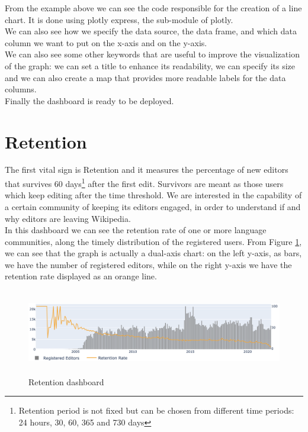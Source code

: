 From the example above we can see the code responsible for the creation of a line chart. It is done using plotly express, the sub-module of plotly.\\
We can also see how we specify the data source, the data frame, and which data column we want to put on the x-axis and on the y-axis.\\
We can also see some other keywords that are useful to improve the visualization of the graph: we can set a title to enhance its readability, we can specify its size and we can also create a map that provides more readable labels for the data columns.\\
Finally the dashboard is ready to be deployed.

\section{Retention}
\label{sec:retention}

The first vital sign is Retention and it measures the percentage of new editors that survives 60 days\footnote{Retention period is not fixed but can be chosen from different time periods: 24 hours, 30, 60, 365 and 730 days} after the first edit. Survivors are meant as those users which keep editing after the time threshold. We are interested in the capability of a certain community of keeping its editors engaged, in order to understand if and why editors are leaving Wikipedia.\\
In this dashboard we can see the retention rate of one or more language communities, along the timely distribution of the registered users. From Figure \ref{fig:retention}, we can see that the graph is actually a dual-axis chart: on the left y-axis, as bars, we have the number of registered editors, while on the right y-axis we have the retention rate displayed as an orange line.

\begin{figure}[h]
    \centering
    \includegraphics[height=140px, width=480px]{img/retention.png}
    \caption{Retention dashboard}
    \label{fig:retention}
\end{figure}

